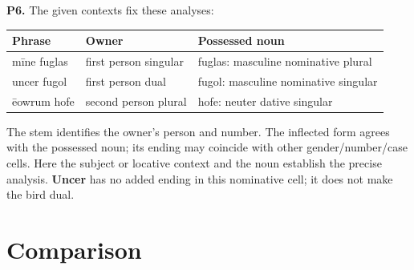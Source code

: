 \par\begin{minipage}{\linewidth}\raggedright
\textbf{P6.} The given contexts fix these analyses:

\par\begingroup
\fontsize{10.5}{13.2}\selectfont
\setlength{\LTleft}{0pt}\setlength{\LTright}{\fill}
\noindent
\begin{tabular}{@{}>{\raggedright\arraybackslash}p{25.99mm}>{\raggedright\arraybackslash}p{35.99mm}>{\raggedright\arraybackslash}p{56.39mm}@{}}
\toprule
\textbf{Phrase} & \textbf{Owner} & \textbf{Possessed noun} \\
\midrule
mīne fuglas & first person singular & fuglas: masculine nominative plural \\
uncer fugol & first person dual & fugol: masculine nominative singular \\
ēowrum hofe & second person plural & hofe: neuter dative singular \\
\bottomrule
\end{tabular}
\par\endgroup

The stem identifies the owner’s person and number. The inflected form agrees with the possessed noun; its ending may coincide with other gender/\allowbreak{}number/\allowbreak{}case cells. Here the subject or locative context and the noun establish the precise analysis. \textbf{Uncer} has no added ending in this nominative cell; it does not make the bird dual.

\end{minipage}\par\addvspace{4pt}

\section*{Comparison}

